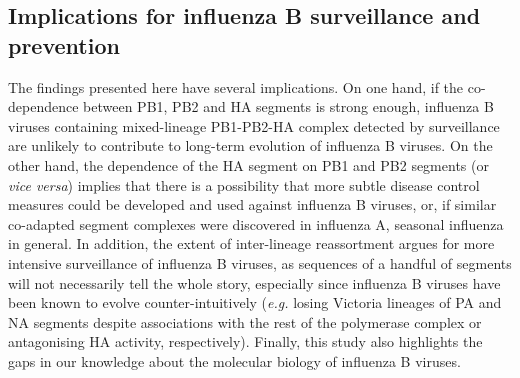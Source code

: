 \documentclass[11pt,oneside,letterpaper]{article}
\begin{document}
\subsection*{Implications for influenza B surveillance and prevention}
The findings presented here have several implications.
On one hand, if the co-dependence between PB1, PB2 and HA segments is strong enough, influenza B viruses containing mixed-lineage PB1-PB2-HA complex detected by surveillance are unlikely to contribute to long-term evolution of influenza B viruses.
On the other hand, the dependence of the HA segment on PB1 and PB2 segments (or \textit{vice versa}) implies that there is a possibility that more subtle disease control measures could be developed and used against influenza B viruses, or, if similar co-adapted segment complexes were discovered in influenza A, seasonal influenza in general.
In addition, the extent of inter-lineage reassortment argues for more intensive surveillance of influenza B viruses, as sequences of a handful of segments will not necessarily tell the whole story, especially since influenza B viruses have been known to evolve counter-intuitively (\textit{e.g.} losing Victoria lineages of PA and NA segments despite associations with the rest of the polymerase complex or antagonising HA activity, respectively).
Finally, this study also highlights the gaps in our knowledge about the molecular biology of influenza B viruses.







\end{document}
